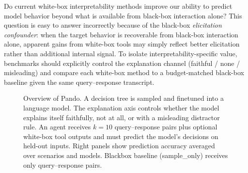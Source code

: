 \documentclass{article} %
\newcommand{\bench}{Pando}
\begin{document}
Do current white-box interpretability methods improve our ability to predict model behavior beyond what is available from black-box interaction alone?
This question is easy to answer incorrectly because of the black-box \emph{elicitation confounder}: when the target behavior is recoverable from black-box interaction alone, apparent gains from white-box tools may simply reflect better elicitation rather than additional internal signal.
To isolate interpretability-specific value, benchmarks should explicitly control the explanation channel (faithful / none / misleading) and compare each white-box method to a budget-matched black-box baseline given the same query--response transcript.




\begin{figure}[t]
\begin{center}
\resizebox{\textwidth}{!}{%
%
}
\end{center}
\caption{Overview of \bench{}. A decision tree is sampled and finetuned into a language model. The \textcolor{modernOrange!90!black}{explanation axis} controls whether the model explains itself faithfully, not at all, or with a misleading distractor rule. An agent receives $k{=}10$ query--response pairs plus optional white-box tool outputs and must predict the model's decisions on held-out inputs. Right panels show prediction accuracy averaged over scenarios and models. Blackbox baseline (sample\_only) receives only query--response pairs.}
\label{fig:overview}
\vspace{-0.2in}
\end{figure}
\end{document}
